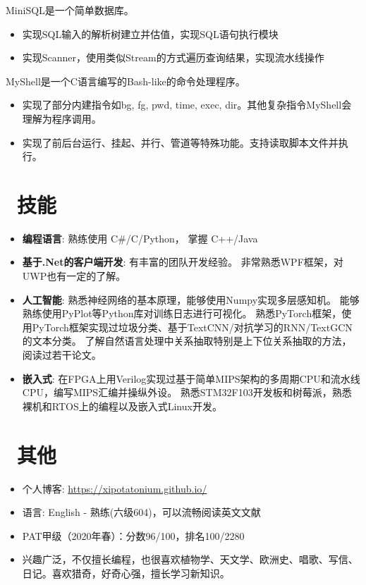 \documentclass{resume}
\begin{document}
MiniSQL是一个简单数据库。
\begin{itemize}
  \item 实现SQL输入的解析树建立并估值，实现SQL语句执行模块
  \item 实现Scanner，使用类似Stream的方式遍历查询结果，实现流水线操作
\end{itemize}

MyShell是一个C语言编写的Bash-like的命令处理程序。
\begin{itemize}
    \item 实现了部分内建指令如bg, fg, pwd, time, exec, dir。其他复杂指令MyShell会理解为程序调用。
    \item 实现了前后台运行、挂起、并行、管道等特殊功能。支持读取脚本文件并执行。
\end{itemize}

\section{\faCogs\ 技能}
\begin{itemize}[parsep=0.25ex]
    \item \textbf{编程语言}:
        熟练使用 C\#/C/Python，
        掌握 C++/Java

    \item \textbf{基于.Net的客户端开发}:
        有丰富的团队开发经验。
        非常熟悉WPF框架，对UWP也有一定的了解。

    \item \textbf{人工智能}:
        熟悉神经网络的基本原理，能够使用Numpy实现多层感知机。
        能够熟练使用PyPlot等Python库对训练日志进行可视化。
        熟悉PyTorch框架，使用PyTorch框架实现过垃圾分类、基于TextCNN/对抗学习的RNN/TextGCN的文本分类。
        了解自然语言处理中关系抽取特别是上下位关系抽取的方法，阅读过若干论文。

    \item \textbf{嵌入式}:
        在FPGA上用Verilog实现过基于简单MIPS架构的多周期CPU和流水线CPU，编写MIPS汇编并操纵外设。
        熟悉STM32F103开发板和树莓派，熟悉裸机和RTOS上的编程以及嵌入式Linux开发。
\end{itemize}


\section{\faInfo\ 其他}
\begin{itemize}[parsep=0.25ex]
  \item 个人博客: \url{https://xipotatonium.github.io/}
  \item 语言: English - 熟练(六级604)，可以流畅阅读英文文献
  \item PAT甲级（2020年春）：分数96/100，排名100/2280
  \item 兴趣广泛，不仅擅长编程，也很喜欢植物学、天文学、欧洲史、唱歌、写信、日记。喜欢猎奇，好奇心强，擅长学习新知识。
\end{itemize}
\end{document}

